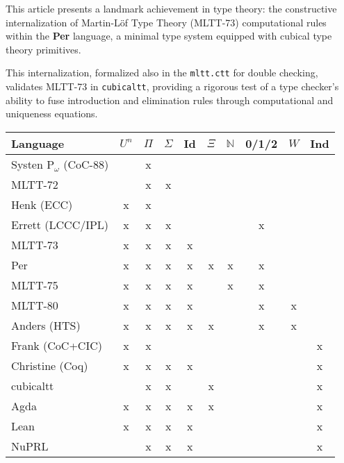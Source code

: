 \documentclass{article}
\begin{document}
This article presents a landmark achievement in type theory:
the constructive internalization of Martin-Löf Type Theory (MLTT-73) computational rules
within the \textbf{Per} language, a minimal type system equipped with
cubical type theory primitives.

This internalization, formalized also in the \texttt{mltt.ctt} for double checking,
validates MLTT-73 in \texttt{cubicaltt}, providing a rigorous test
of a type checker's ability to fuse introduction and elimination
rules through computational and uniqueness equations.

\begin{table}[!ht]
  \begin{tabular}{lccccccccc}
    \hline
       Language    & $U^n$ & $\Pi$ & $\Sigma$ & Id & $\Xi$ & $\mathbb{N}$ & 0/1/2 & $W$ & Ind  \\
    \hline
Systen P$_\omega$ (CoC-88)  &   & x &   &   &   &   &   &   &   \\
       MLTT-72              &   & x & x &   &   &   &   &   &   \\
       Henk (ECC)           & x & x &   &   &   &   &   &   &   \\
       Errett (LCCC/IPL)    & x & x & x &   &   &   & x &   &   \\
       MLTT-73              & x & x & x & x &   &   &   &   &   \\
       Per                  & x & x & x & x & x & x & x &   &   \\
       MLTT-75              & x & x & x & x &   & x & x &   &   \\
       MLTT-80              & x & x & x & x &   & & x   & x &   \\
       Anders (HTS)         & x & x & x & x & x &   & x & x &   \\
       Frank (CoC+CIC)      & x & x &   &   &   &   &   &   & x \\
       Christine (Coq)      & x & x & x & x &   &   &   &   & x \\
    \hline
       cubicaltt            &   & x & x &   & x &   &   &   & x \\
       Agda                 & x & x & x & x & x &   &   &   & x \\
       Lean                 & x & x & x & x &   &   &   &   & x \\
       NuPRL                &   & x & x & x &   &   &   &   & x \\
    \hline
  \end{tabular}
\end{table}
\end{document}
